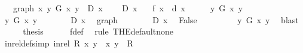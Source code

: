 \begin{isabellebody}
\ \ \ graph{\isacharcolon}{\kern0pt}\ {\isachardoublequoteopen}{\isasymAnd}x\ y{\isachardot}{\kern0pt}\ G\ x\ y\ {\isasymLongrightarrow}\ D\ x{\isachardoublequoteclose}\isanewline
\ \ \ {\isachardoublequoteopen}{\isasymnot}\ D\ x{\isachardoublequoteclose}\isanewline
\ \ \ {\isachardoublequoteopen}f\ x\ {\isacharequal}{\kern0pt}\ d\ x{\isachardoublequoteclose}\isanewline
%
\isadelimproof
%
\endisadelimproof
%
\isatagproof
{}\isamarkupfalse%
\ {\isacharminus}{\kern0pt}\isanewline
\ \ \isamarkupfalse%
\ {\isachardoublequoteopen}{\isasymnot}{\isacharparenleft}{\kern0pt}{\isasymexists}y{\isachardot}{\kern0pt}\ G\ x\ y{\isacharparenright}{\kern0pt}{\isachardoublequoteclose}\isanewline
\ \ \isamarkupfalse%
\isanewline
\ \ \ \ \isamarkupfalse%
\ {\isachardoublequoteopen}{\isasymexists}y{\isachardot}{\kern0pt}\ G\ x\ y{\isachardoublequoteclose}\isanewline
\ \ \ \ \isamarkupfalse%
\ \isamarkupfalse%
\ {\isachardoublequoteopen}D\ x{\isachardoublequoteclose}\ \isamarkupfalse%
\ graph\ \isacommand{{\isachardot}{\kern0pt}{\isachardot}{\kern0pt}}\isamarkupfalse%
\isanewline
\ \ \ \ \isamarkupfalse%
\ {\isacartoucheopen}{\isasymnot}\ D\ x{\isacartoucheclose}\ \isamarkupfalse%
\ False\ \isacommand{{\isachardot}{\kern0pt}{\isachardot}{\kern0pt}}\isamarkupfalse%
\isanewline
\ \ \isamarkupfalse%
\isanewline
\ \ \isamarkupfalse%
\ \isamarkupfalse%
\ {\isachardoublequoteopen}{\isasymnot}{\isacharparenleft}{\kern0pt}{\isasymexists}{\isacharbang}{\kern0pt}y{\isachardot}{\kern0pt}\ G\ x\ y{\isacharparenright}{\kern0pt}{\isachardoublequoteclose}\ \isamarkupfalse%
\ blast\isanewline
\ \ \isamarkupfalse%
\ \isamarkupfalse%
\ {\isacharquery}{\kern0pt}thesis\isanewline
\ \ \ \ \isamarkupfalse%
\ f{\isacharunderscore}{\kern0pt}def\ \isamarkupfalse%
\ {\isacharparenleft}{\kern0pt}rule\ THE{\isacharunderscore}{\kern0pt}default{\isacharunderscore}{\kern0pt}none{\isacharparenright}{\kern0pt}\isanewline
{}\isamarkupfalse%
%
\endisatagproof
{\isafoldproof}%
%
\isadelimproof
\isanewline
%
\endisadelimproof
\isanewline
{}\isamarkupfalse%
\ in{\isacharunderscore}{\kern0pt}rel{\isacharunderscore}{\kern0pt}def{\isacharbrackleft}{\kern0pt}simp{\isacharbrackright}{\kern0pt}{\isacharcolon}{\kern0pt}\ {\isachardoublequoteopen}in{\isacharunderscore}{\kern0pt}rel\ R\ x\ y\ {\isasymequiv}\ {\isacharparenleft}{\kern0pt}x{\isacharcomma}{\kern0pt}\ y{\isacharparenright}{\kern0pt}\ {\isasymin}\ R{\isachardoublequoteclose}\isanewline

\end{isabellebody}
